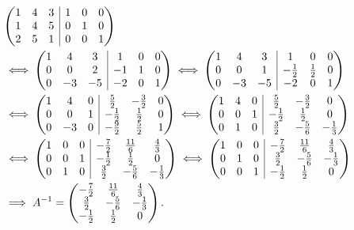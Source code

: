 \documentclass[main.tex]{subfiles}
\begin{document}
\begin{align*}
    &\parens{\begin{array}{@{}c c c | c c c@{}}
        1 & 4 & 3 & 1 & 0 & 0 \\
        1 & 4 & 5 & 0 & 1 & 0 \\
        2 & 5 & 1 & 0 & 0 & 1
    \end{array}} \\
    &\iff \parens{\begin{array}{@{}c c c | c c c@{}}
        1 & 4 & 3 & 1 & 0 & 0 \\
        0 & 0 & 2 & -1 & 1 & 0 \\
        0 & -3 & -5 & -2 & 0 & 1
    \end{array}} \iff \parens{\begin{array}{@{}c c c | c c c@{}}
        1 & 4 & 3 & 1 & 0 & 0 \\
        0 & 0 & 1 & -\frac{1}{2} & \frac{1}{2} & 0 \\
        0 & -3 & -5 & -2 & 0 & 1
    \end{array}} \\
    &\iff \parens{\begin{array}{@{}c c c | c c c@{}}
        1 & 4 & 0 & \frac{5}{2} & -\frac{3}{2} & 0 \\
        0 & 0 & 1 & -\frac{1}{2} & \frac{1}{2} & 0 \\
        0 & -3 & 0 & -\frac{9}{2} & \frac{5}{2} & 1
    \end{array}} \iff \parens{\begin{array}{@{}c c c | c c c@{}}
        1 & 4 & 0 & \frac{5}{2} & -\frac{3}{2} & 0 \\
        0 & 0 & 1 & -\frac{1}{2} & \frac{1}{2} & 0 \\
        0 & 1 & 0 & \frac{3}{2} & -\frac{5}{6} & -\frac{1}{3}
    \end{array}} \\
    &\iff \parens{\begin{array}{@{}c c c | c c c@{}}
        1 & 0 & 0 & -\frac{7}{2} & \frac{11}{6} & \frac{4}{3} \\
        0 & 0 & 1 & -\frac{1}{2} & \frac{1}{2} & 0 \\
        0 & 1 & 0 & \frac{3}{2} & -\frac{5}{6} & -\frac{1}{3}
    \end{array}} \iff \parens{\begin{array}{@{}c c c | c c c@{}}
        1 & 0 & 0 & -\frac{7}{2} & \frac{11}{6} & \frac{4}{3} \\
        0 & 1 & 0 & \frac{3}{2} & -\frac{5}{6} & -\frac{1}{3} \\
        0 & 0 & 1 & -\frac{1}{2} & \frac{1}{2} & 0
    \end{array}} \\
    &\implies A^{-1} = \begin{pmatrix}
        -\frac{7}{2} & \frac{11}{6} & \frac{4}{3} \\
        \frac{3}{2} & -\frac{5}{6} & -\frac{1}{3} \\
        -\frac{1}{2} & \frac{1}{2} & 0
    \end{pmatrix}.
\end{align*}
\end{document}
